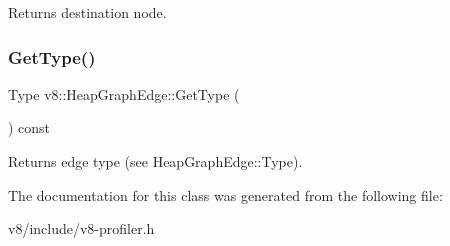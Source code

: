 Returns destination node. \mbox{\label{classv8_1_1HeapGraphEdge_a7d784f0b7a5bf532e9d4ec86bcb94092}} 
\subsubsection{\texorpdfstring{Get\+Type()}{GetType()}}
{\footnotesize\ttfamily Type v8\+::\+Heap\+Graph\+Edge\+::\+Get\+Type (\begin{DoxyParamCaption}{ }\end{DoxyParamCaption}) const}

Returns edge type (see Heap\+Graph\+Edge\+::\+Type). 

The documentation for this class was generated from the following file\+:\begin{DoxyCompactItemize}
\item 
v8/include/v8-\/profiler.\+h\end{DoxyCompactItemize}

